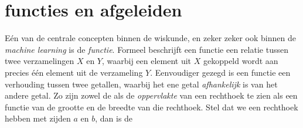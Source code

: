 \section{functies en afgeleiden}

Eén van de centrale concepten binnen de wiskunde, en zeker zeker ook binnen de \textit{machine learning} is de \textit{functie}. Formeel beschrijft een functie een relatie tussen twee verzamelingen $X$ en $Y$, waarbij een element uit $X$ gekoppeld wordt aan precies één element uit de verzameling $Y$. Eenvoudiger gezegd is een functie een verhouding tussen twee getallen, waarbij het ene getal \textit{afhankelijk} is van het andere getal. Zo zijn zowel de  als de \textit{oppervlakte} van een rechthoek te zien als een functie van de grootte en de breedte van die rechthoek. Stel dat we een rechthoek hebben met zijden $a$ en $b$, dan is de 